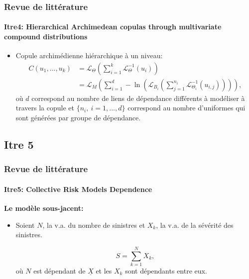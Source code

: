\documentclass[11pt]{beamer}
\begin{document}
\begin{frame}
	\frametitle{Revue de littérature}
	\framesubtitle{Itre4: Hierarchical Archimedean copulas through multivariate compound
		distributions \cite{Itre4}}
	\begin{itemize}
		\item Copule archimédienne hiérarchique à un niveau:
		\begin{align}
			C(u_1, ... , u_k) 
			&= \mathcal{L}_{\Theta}\left(
				\sum_{i=1}^{k} \mathcal{L}_{\Theta}^{-1} (u_i) \right) \nonumber \\
			&= \mathcal{L}_{M}\left(
				\sum_{i=1}^{d} - \ln \left(
				 \mathcal{L}_{B_i}\left(
				  \sum_{j=1}^{n_i} \mathcal{L}_{\Theta_i}^{-1} (u_{i,j})
				\right) \right)\right), \label{Copule_Archimedienne}
		\end{align}
		où $d$ correspond au nombre de liens de dépendance différents à modéliser à travers la copule et $\{n_i,\ i=1,...,d\}$ correspond au nombre d'uniformes qui sont générées par groupe de dépendance.
		
	\end{itemize}

\end{frame}


\subsection{Itre 5}
\begin{frame}
	\frametitle{Revue de littérature}
	\framesubtitle{Itre5: Collective Risk Models Dependence \cite{Itre5}}

		\textbf{Le modèle sous-jacent:}
		\begin{itemize}
			\item Soient $N$, la v.a. du nombre de sinistres et $X_k$, la v.a. de la sévérité des sinistres.
			
		\begin{equation}\label{Modele_collectif}
			S = \sum_{k=1}^{N} X_k,
		\end{equation}
		où $N$ est dépendant de $\underline{X}$ et les $X_k$ sont dépendants entre eux.
	
		\end{itemize}
\end{frame}
\end{document}
